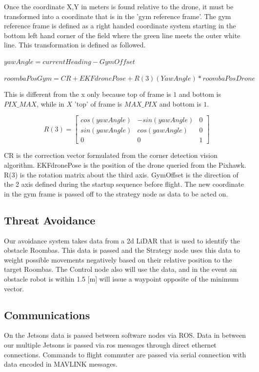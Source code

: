 \documentclass[12pt,letterpaper]{article}
\begin{document}
		Once the coordinate X,Y in meters is found relative to the drone, it must be transformed into a coordinate that is in the 'gym reference frame'. The gym reference frame is defined as a right handed coordinate system starting in the bottom left hand corner of the field where the green line meets the outer white line. This transformation is defined as followed.

		\begin{center}
			$yawAngle = currentHeading - GymOffset$
		\end{center}
		\begin{center}
			$roombaPosGym = CR + EKFdronePose + R(3)(YawAngle)*roombaPosDrone$
		\end{center}


		This is different from the x only because top of frame is $1$ and bottom is $PIX\_MAX$, while in $X$ 'top' of frame is $MAX\_PIX$ and bottom is $1$.

		\[
		R(3) =
			\begin{bmatrix}
			cos(yawAngle) & -sin(yawAngle) & 0 \\
			sin(yawAngle) & cos(yawAngle)  & 0 \\
			0 & 0 & 1
			\end{bmatrix}
		\]

		CR is the correction vector formulated from the corner detection vision algorithm. EKFdronePose is the position of the drone queried from the Pixhawk. R(3) is the rotation matrix about the third axis. GymOffset is the direction of the 2 axis defined during the startup sequence before flight. The new coordinate in the gym frame is passed off to the strategy node as data to be acted on.
	\subsection*{Threat Avoidance}
		Our avoidance system takes data from a 2d LiDAR that is used to identify the obstacle Roombas. This data is passed and the Strategy node uses this data to weight possible movements negatively based on their relative position to the target Roombas. The Control node also will use the data, and in the event an obstacle robot is within 1.5 [m] will issue a waypoint opposite of the minimum vector.

	\subsection*{Communications}
		On the Jetsons data is passed between software nodes via ROS. Data in between our multiple Jetsons is passed via ros messages through direct ethernet connections. Commands to flight commuter are passed via serial connection with data encoded in MAVLINK messages.
\end{document}
